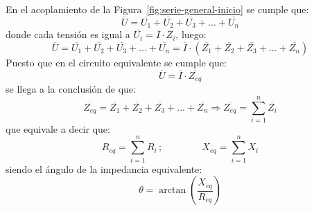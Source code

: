 En el acoplamiento de la Figura~\ref{fig:serie-general-inicio} se
cumple que:
\begin{equation*}
  \overline{U}=\overline{U_1}+\overline{U_2}+\overline{U_3}+...+\overline{U_n}
\end{equation*}
donde cada tensión es igual a
$\overline{U_i}=\overline{I}\cdot\overline{Z_i}$, luego:
\begin{equation*}
  \overline{U}=\overline{U_1}+\overline{U_2}+\overline{U_3}+...+\overline{U_n}=\overline{I} \cdot(\overline{Z_1}+\overline{Z_2}+\overline{Z_3}+...+\overline{Z_n})
\end{equation*}
Puesto que en el circuito equivalente se cumple que:
\begin{equation*}
  \overline{U}=\overline{I}\cdot\overline{Z_{eq}}
\end{equation*}
se llega a la conclusión de que:
\begin{equation}
  \overline{Z_{eq}}=\overline{Z_1}+\overline{Z_2}+\overline{Z_3}+...+\overline{Z_n}\Rightarrow \boxed{\overline{Z_{eq}}=\sum_{i=1}^n \overline{Z_i}}
\end{equation}
que equivale a decir que:
\begin{equation*}
  R_{eq}=\sum_{i=1}^n R_i\,;\qquad \qquad X_{eq}=\sum_{i=1}^n X_i
\end{equation*}
siendo el ángulo de la impedancia equivalente:
\begin{equation*}
  \theta=\arctan\left(\dfrac{X_{eq}}{R_{eq}}\right)
\end{equation*}
	
